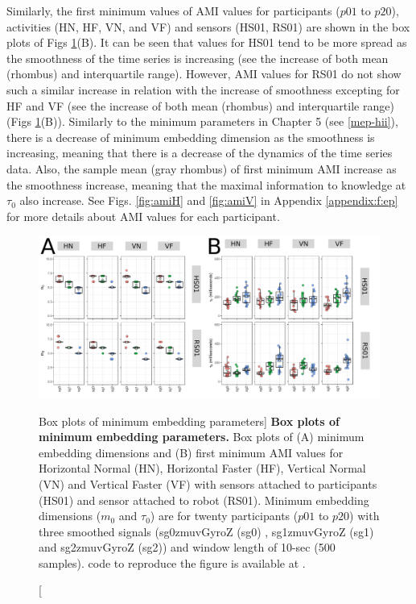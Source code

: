 Similarly, the first minimum values of AMI values 
for participants ($p01$ to $p20$), activities (HN, HF, VN, and VF) and 
sensors (HS01, RS01) are shown in the box plots of 
Figs \ref{fig:CAOAMI-hhi}(B).
It can be seen that values for HS01 tend to be more spread as the smoothness 
of the time series is increasing 
(see the increase of both mean (rhombus) and interquartile range).
However, AMI values for RS01 do not show such a similar increase in relation with
the increase of smoothness excepting for HF and VF
(see the increase of both mean (rhombus) and interquartile range) 
(Figs \ref{fig:CAOAMI-hhi}(B)).
Similarly to the minimum parameters in Chapter 5 (see \ref{mep-hii}),
there is a decrease of minimum embedding dimension as the smoothness 
is increasing, meaning that there is a decrease of the dynamics of 
the time series data. Also, the sample mean (gray rhombus) 
of first minimum AMI increase as the smoothness increase,
meaning that the maximal information to knowledge at $\tau_0$ 
also increase.
See Figs. \ref{fig:amiH} and \ref{fig:amiV} in Appendix \ref{appendix:f:ep} 
for more details about AMI values for each participant.
\begin{figure}
\centering
\includegraphics[width=1.0\textwidth]{fig_6_03}
	\caption
	[Box plots of minimum embedding parameters]{
	{\bf Box plots of minimum embedding parameters.} 
		Box plots of (A) minimum embedding dimensions 
		and (B) first minimum AMI values for 
		Horizontal Normal (HN), Horizontal Faster (HF),
		Vertical Normal (VN) and Vertical Faster (VF)
		with sensors attached to participants (HS01) and
		sensor attached to robot (RS01).
		Minimum embedding dimensions 
		($m_0$ and $\tau_0$)
		are for twenty participants 
		($p01$ to $p20$) with three smoothed signals 
		(sg0zmuvGyroZ (sg0) , sg1zmuvGyroZ (sg1) and sg2zmuvGyroZ (sg2))
		and window length of 10-sec (500 samples).
	\R code to reproduce the figure is available at 
	.
        }
    \label{fig:CAOAMI-hhi}
\end{figure}

